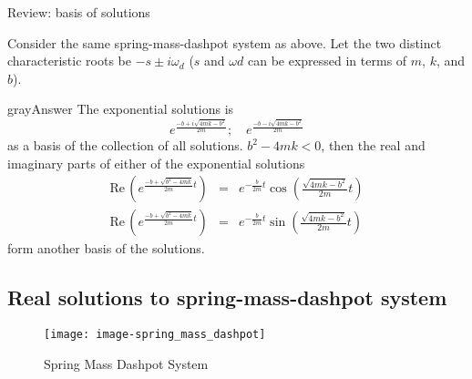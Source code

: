 \begin{exercise}
  Review: basis of solutions
\end{exercise}
Consider the same spring-mass-dashpot system as above.
Let the two distinct characteristic roots be $ -s\pm i\omega _ d$
($s$ and $\omega d$ can be expressed in terms of $m$, $k$, and $b$).
\begin{mybox}{gray}{Answer}
  The exponential solutions is
  \begin{equation*}
    \displaystyle e^{\frac{-b + i\sqrt{4mk -b^2}}{2m}} ; \quad
    \displaystyle e^{\frac{-b - i\sqrt{4mk -b^2}}{2m}}
  \end{equation*}
  as a basis of the collection of all solutions.
  $b^2 - 4mk < 0$,  then the real and imaginary parts of either of the exponential solutions
  \begin{eqnarray*}
    \displaystyle \mathrm{Re\, }\left(e^{\frac{-b+\sqrt {b^2-4mk}}{2m}t}\right)
    & \displaystyle =& \displaystyle e^{-\frac{b}{2m}t}\cos \left(\frac{\sqrt {4mk-b^2}}{2m}t\right)\\
    \displaystyle \mathrm{Re\, }\left(e^{\frac{-b+\sqrt {b^2-4mk}}{2m}t}\right)
    & \displaystyle =& \displaystyle e^{-\frac{b}{2m}t}\sin \left(\frac{\sqrt {4mk-b^2}}{2m}t\right)
  \end{eqnarray*}
  form another basis of the solutions.
\end{mybox}
\clearpage

\subsection{Real solutions to spring-mass-dashpot system}
\begin{figure}[ht!]
  \centering
  \texttt{[image: image-spring\_mass\_dashpot]}
  \caption{Spring Mass Dashpot System}
\end{figure}


